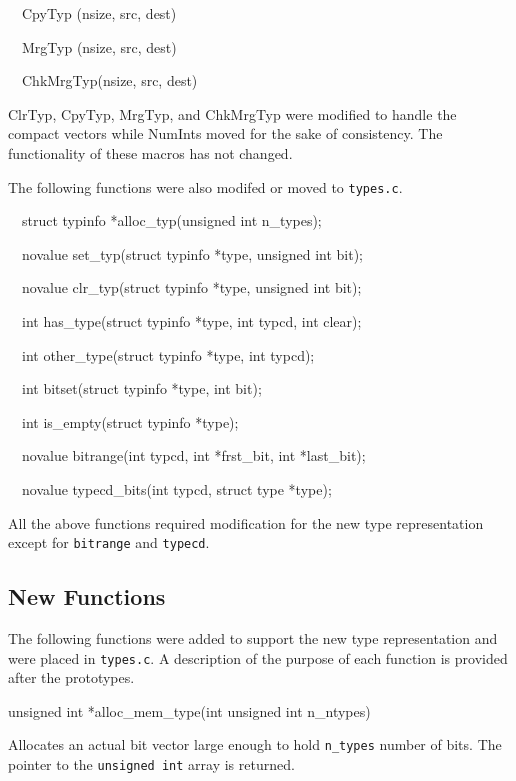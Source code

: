 {\ttfamily\mdseries
\ \ CpyTyp (nsize, src, dest)}

{\ttfamily\mdseries
\ \ MrgTyp (nsize, src, dest)}

{\ttfamily\mdseries
\ \ ChkMrgTyp(nsize, src, dest)}

ClrTyp, CpyTyp, MrgTyp, and ChkMrgTyp were modified to handle the
compact vectors while NumInts moved for the sake of consistency. The
functionality of these macros has not changed.

The following functions were also modifed or moved to \texttt{types.c}.

{\ttfamily\mdseries
\ \ struct typinfo *alloc\_typ(unsigned int n\_types);}

{\ttfamily\mdseries
\ \ novalue set\_typ(struct typinfo *type, unsigned int bit);}

{\ttfamily\mdseries
\ \ novalue clr\_typ(struct typinfo *type, unsigned int bit);}

{\ttfamily\mdseries
\ \ int has\_type(struct typinfo *type, int typcd, int clear);}

{\ttfamily\mdseries
\ \ int other\_type(struct typinfo *type, int typcd);}

{\ttfamily\mdseries
\ \ int bitset(struct typinfo *type, int bit);}

{\ttfamily\mdseries
\ \ int is\_empty(struct typinfo *type);}

{\ttfamily\mdseries
\ \ novalue bitrange(int typcd, int *frst\_bit, int *last\_bit);}

{\ttfamily\mdseries
\ \ novalue typecd\_bits(int typcd, struct type *type);}


All the above functions required modification for the new type
representation except for \texttt{bitrange} and \texttt{typecd}.

\subsection{New Functions}

The following functions were added to support the new type
representation and were placed in \texttt{types.c}. A description of
the purpose of each function is provided after the prototypes.

{\ttfamily\mdseries
unsigned int *alloc\_mem\_type(int unsigned int n\_ntypes)}

Allocates an actual bit vector large enough to hold \texttt{n\_types}
number of bits. The pointer to the \texttt{unsigned int} array is
returned.

